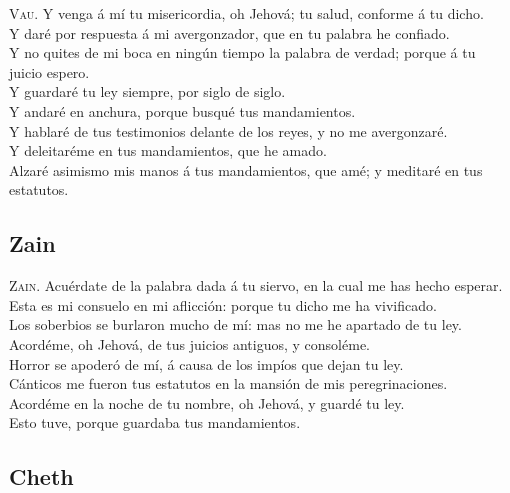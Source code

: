  \textsc{Vau}. Y venga á mí tu misericordia, oh Jehová;
tu salud, conforme á tu dicho.\\
 Y daré por respuesta á mi avergonzador, que en tu
palabra he confiado.\\
 Y no quites de mi boca en ningún tiempo la palabra de
verdad; porque á tu juicio espero.\\
 Y guardaré tu ley siempre, por siglo de siglo.\\
 Y andaré en anchura, porque busqué tus mandamientos.\\
 Y hablaré de tus testimonios delante de los reyes, y no
me avergonzaré.\\
 Y deleitaréme en tus mandamientos, que he amado.\\
 Alzaré asimismo mis manos á tus mandamientos, que amé; y
meditaré en tus estatutos.

\hypertarget{zain}{%
\subsection{Zain}\label{zain}}

 \textsc{Zain}. Acuérdate de la palabra dada á tu siervo,
en la cual me has hecho esperar.\\
 Esta es mi consuelo en mi aflicción: porque tu dicho me
ha vivificado.\\
 Los soberbios se burlaron mucho de mí: mas no me he
apartado de tu ley.\\
 Acordéme, oh Jehová, de tus juicios antiguos, y
consoléme.\\
 Horror se apoderó de mí, á causa de los impíos que dejan
tu ley.\\
 Cánticos me fueron tus estatutos en la mansión de mis
peregrinaciones.\\
 Acordéme en la noche de tu nombre, oh Jehová, y guardé
tu ley.\\
 Esto tuve, porque guardaba tus mandamientos.

\hypertarget{cheth}{%
\subsection{Cheth}\label{cheth}}

